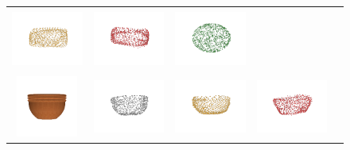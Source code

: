 \documentclass[bachelor, nocolorlinks, printoneside]{seuthesis} %
\begin{document}
\begin{Appendix}{}
\begin{figure}[!h]
\begin{tabular}{c@{}c@{}c@{}c@{}c@{}}
            \includegraphics[width=0.22\columnwidth,height=2cm]{figs/supp_real_dataset/AE_label/pillow_68131b4f51579263f7b57f419ab2620_pred.png} &
            \includegraphics[width=0.22\columnwidth,height=2cm]{figs/supp_real_dataset/AE/pillow_68131b4f51579263f7b57f419ab2620_pred.png} &
            \includegraphics[width=0.22\columnwidth,height=2cm]{figs/supp_real_dataset/oracle/pillow_68131b4f51579263f7b57f419ab2620_oracle.png} \\
            \vspace{-5mm}
            \includegraphics[width=0.11\columnwidth,height=2cm]{figs/supp_real_dataset/Image/pot_490e2e25da735cfd3df324363ca0723f.png} &
            \includegraphics[width=0.22\columnwidth,height=2cm]{figs/supp_real_dataset/GT/pot_490e2e25da735cfd3df324363ca0723f_gt.png} &
            \includegraphics[width=0.22\columnwidth,height=2cm]{figs/supp_real_dataset/AE_label/pot_490e2e25da735cfd3df324363ca0723f_label.png} &
            \includegraphics[width=0.22\columnwidth,height=2cm]{figs/supp_real_dataset/AE/pot_490e2e25da735cfd3df324363ca0723f_pred.png} &

\end{tabular}
\end{figure}
\end{Appendix}
\end{document}
